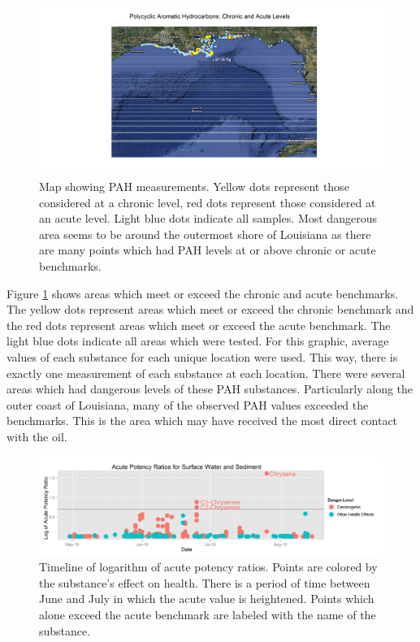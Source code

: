 \documentclass[11pt]{article}
\begin{document}
\begin{figure}[htbp] %
   \centering
   \includegraphics[width=5in]{chron-acute-map.png} 
   \caption{Map showing PAH measurements. Yellow dots represent those considered at a chronic level, red dots represent those considered at an acute level.  Light blue dots indicate all samples.  Most dangerous area seems to be around the outermost shore of Louisiana as there are many points which had PAH levels at or above chronic or acute benchmarks.}
   \label{pah-map}
\end{figure}


Figure \ref{pah-map} shows areas which meet or exceed the chronic and acute benchmarks.  The yellow dots represent areas which meet or exceed the chronic benchmark and the red dots represent areas which meet or exceed the acute benchmark.  The light blue dots indicate all areas which were tested.  For this graphic, average values of each substance for each unique location were used.  This way, there is exactly one measurement of each substance at each location.  There were several areas which had dangerous levels of these PAH substances.  Particularly along the outer coast of Louisiana, many of the observed PAH values exceeded the benchmarks.  This is the area which may have received the most direct contact with the oil.  

\begin{figure}[htbp] %
   \centering
   \includegraphics[width=5in]{acute-timeline3.png} 
   \caption{Timeline of logarithm of acute potency ratios.  Points are colored by the substance's effect on health. There is a period of time between June and July in which the acute value is heightened.  Points which alone exceed the acute benchmark are labeled with the name of the substance.}
   \label{pah-timeline}
\end{figure}
\end{document}
